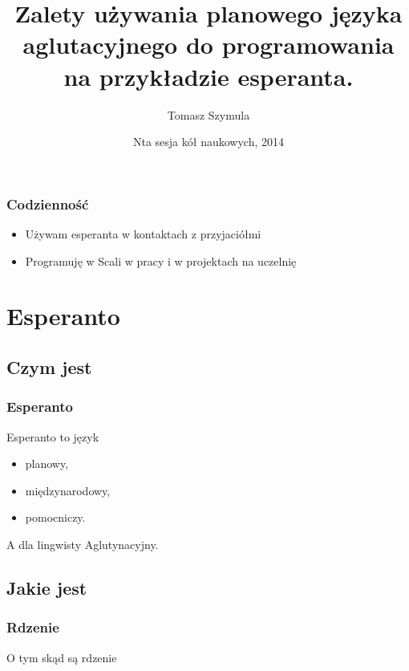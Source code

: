 \documentclass{beamer}
\title[Esperanto w programowaniu]{Zalety używania planowego języka aglutacyjnego do programowania na przykładzie esperanta.}
\author{Tomasz Szymula}
\institute[PEJ]{Koło naukowe Blabel, AGH}
\date[2014]{Nta sesja kół naukowych, 2014}
\begin{document}
  \frame{\titlepage}
 
  \begin{frame}
  	\frametitle{Codzienność}
  	
	\begin{itemize}
		\item Używam esperanta w kontaktach z przyjaciółmi
		\item Programuję w Scali w pracy i w projektach na uczelnię
	\end{itemize}
  
  \end{frame}
 

  \section{Esperanto}
  \subsection{Czym jest} 
  
  \begin{frame}
  	\frametitle{Esperanto}
  	
  	\begin{block}{Esperanto to język}
  		\begin{itemize}
  			\item planowy,
			\item międzynarodowy,
			\item pomocniczy.
		\end{itemize}
  	\end{block}
  	
  	\pause

	\begin{block}{A dla lingwisty}
		Aglutynacyjny. 
	\end{block}  	
  	
  \end{frame}
 
  
  
  \subsection{Jakie jest}
  
  \begin{frame}
  	\frametitle{Rdzenie}
	
	O tym skąd są rdzenie

  \end{frame}
  
\end{document}

